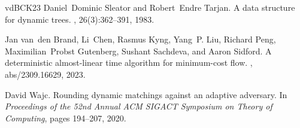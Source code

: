 \documentclass[a4paper,11pt]{article}
\theoremstyle{definition}
\theoremstyle{definition}
\theoremstyle{definition}
\theoremstyle{definition}
\theoremstyle{definition}
\theoremstyle{definition}
\theoremstyle{definition}
\theoremstyle{definition}
\theoremstyle{definition}
\theoremstyle{definition}
\theoremstyle{definition}
\theoremstyle{definition}
\theoremstyle{definition}
\theoremstyle{definition}
\theoremstyle{definition}
\begin{document}
\begin{thebibliography}{vdBCK{\etalchar{+}}23}
Daniel~Dominic Sleator and Robert~Endre Tarjan.
\newblock A data structure for dynamic trees.
, 26(3):362--391, 1983.

Jan van~den Brand, Li~Chen, Rasmus Kyng, Yang~P. Liu, Richard Peng,
  Maximilian~Probst Gutenberg, Sushant Sachdeva, and Aaron Sidford.
\newblock A deterministic almost-linear time algorithm for minimum-cost flow.
, abs/2309.16629, 2023.

David Wajc.
\newblock Rounding dynamic matchings against an adaptive adversary.
\newblock In {\em Proceedings of the 52nd Annual ACM SIGACT Symposium on Theory
  of Computing}, pages 194--207, 2020.

\end{thebibliography}
\end{document}
